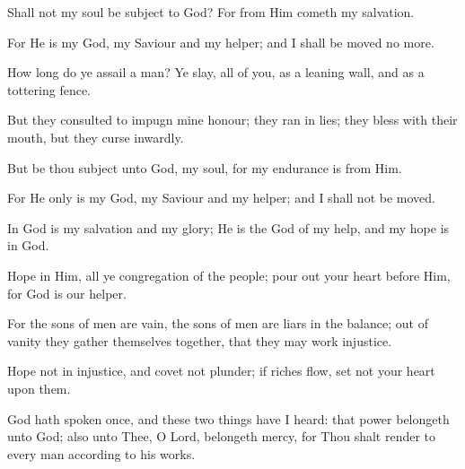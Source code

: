 Shall not my soul be subject to God? For from Him cometh my salvation.

For He is my God, my Saviour and my helper; and I shall be moved no more.

How long do ye assail a man? Ye slay, all of you, as a leaning wall, and as a tottering fence.

But they consulted to impugn mine honour; they ran in lies; they bless with their mouth, but they curse inwardly.

But be thou subject unto God, my soul, for my endurance is from Him.

For He only is my God, my Saviour and my helper; and I shall not be moved.

In God is my salvation and my glory; He is the God of my help, and my hope is in God.

Hope in Him, all ye congregation of the people; pour out your heart before Him, for God is our helper.

For the sons of men are vain, the sons of men are liars in the balance; out of vanity they gather themselves together, that they may work injustice.

Hope not in injustice, and covet not plunder; if riches flow, set not your heart upon them.

God hath spoken once, and these two things have I heard: that power belongeth unto God; also unto Thee, O Lord, belongeth mercy, for Thou shalt render to every man according to his works.

